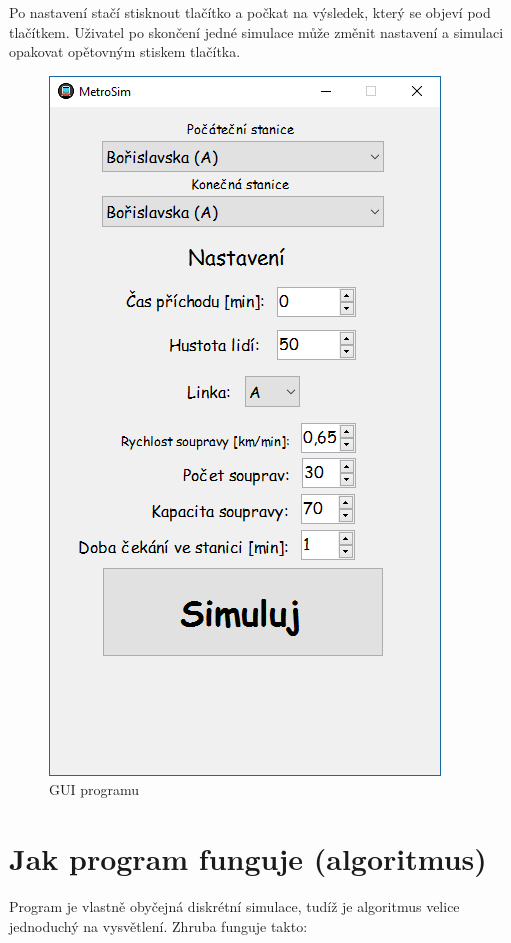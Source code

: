 \documentclass[12pt, a4paper]{article}
\begin{document}
Po nastavení stačí stisknout tlačítko  a počkat na výsledek, který se objeví pod tlačítkem. Uživatel po skončení jedné simulace může změnit nastavení a simulaci opakovat opětovným stiskem tlačítka.
\begin{figure}[h]
\centering
\includegraphics[scale=0.5]{obr1}
\caption{GUI programu}
\end{figure}

\section{Jak program funguje (algoritmus)}

Program je vlastně obyčejná diskrétní simulace, tudíž je algoritmus velice jednoduchý na vysvětlení. Zhruba funguje takto:
\end{document}
